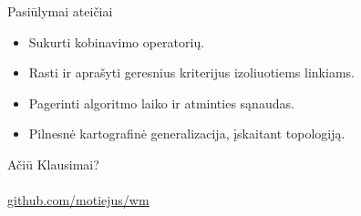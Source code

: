 \documentclass[14pt]{beamer}
\begin{document}
\begin{frame}{Pasiūlymai ateičiai}
  \begin{itemize}
    \item Sukurti kobinavimo operatorių.
    \item Rasti ir aprašyti geresnius kriterijus izoliuotiems linkiams.
    \item Pagerinti algoritmo laiko ir atminties sąnaudas.
    \item Pilnesnė kartografinė generalizacija, įskaitant topologiją.
  \end{itemize}
\end{frame}

\begin{frame}{Ačiū}
  Klausimai? \\ \\

  \href{https://github.com/motiejus/wm}{github.com/motiejus/wm}
\end{frame}
\end{document}
